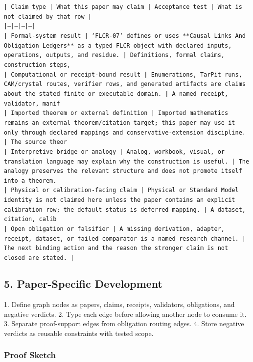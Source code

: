\documentclass[11pt]{article}
\begin{document}
\noindent\texttt{| Claim type | What this paper may claim | Acceptance test | What is not claimed by that row |}\\
\noindent\texttt{|---|---|---|---|}\\
\noindent\texttt{| Formal-system result | `FLCR-07` defines or uses **Causal Links And Obligation Ledgers** as a typed FLCR object with declared inputs, operations, outputs, and residue. | Definitions, formal claims, construction steps, }\\
\noindent\texttt{| Computational or receipt-bound result | Enumerations, TarPit runs, CAM/crystal routes, verifier rows, and generated artifacts are claims about the stated finite or executable domain. | A named receipt, validator, manif}\\
\noindent\texttt{| Imported theorem or external definition | Imported mathematics remains an external theorem/citation target; this paper may use it only through declared mappings and conservative-extension discipline. | The source theor}\\
\noindent\texttt{| Interpretive bridge or analogy | Analog, workbook, visual, or translation language may explain why the construction is useful. | The analogy preserves the relevant structure and does not promote itself into a theorem. }\\
\noindent\texttt{| Physical or calibration-facing claim | Physical or Standard Model identity is not claimed here unless the paper contains an explicit calibration row; the default status is deferred mapping. | A dataset, citation, calib}\\
\noindent\texttt{| Open obligation or falsifier | A missing derivation, adapter, receipt, dataset, or failed comparator is a named research channel. | The next binding action and the reason the stronger claim is not closed are stated. | }\\

\subsection*{5. Paper-Specific Development}

1. Define graph nodes as papers, claims, receipts, validators, obligations, and negative verdicts.
2. Type each edge before allowing another node to consume it.
3. Separate proof-support edges from obligation routing edges.
4. Store negative verdicts as reusable constraints with tested scope.

\subsubsection*{Proof Sketch}
\end{document}
